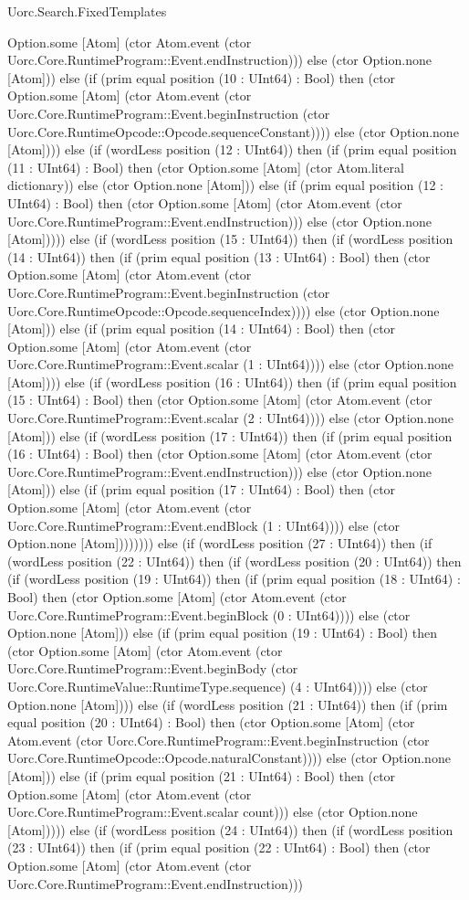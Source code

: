 \begin{lexlean}{Uorc.Search.FixedTemplates}
\begin{semanticmodule}
{Option.some [Atom] (ctor Atom.event (ctor Uorc.Core.RuntimeProgram::Event.endInstruction))) else (ctor Option.none [Atom])) else (if (prim equal position (10 : UInt64) : Bool) then (ctor Option.some [Atom] (ctor Atom.event (ctor Uorc.Core.RuntimeProgram::Event.beginInstruction (ctor Uorc.Core.RuntimeOpcode::Opcode.sequenceConstant)))) else (ctor Option.none [Atom]))) else (if (wordLess position (12 : UInt64)) then (if (prim equal position (11 : UInt64) : Bool) then (ctor Option.some [Atom] (ctor Atom.literal dictionary)) else (ctor Option.none [Atom])) else (if (prim equal position (12 : UInt64) : Bool) then (ctor Option.some [Atom] (ctor Atom.event (ctor Uorc.Core.RuntimeProgram::Event.endInstruction))) else (ctor Option.none [Atom])))) else (if (wordLess position (15 : UInt64)) then (if (wordLess position (14 : UInt64)) then (if (prim equal position (13 : UInt64) : Bool) then (ctor Option.some [Atom] (ctor Atom.event (ctor Uorc.Core.RuntimeProgram::Event.beginInstruction (ctor Uorc.Core.RuntimeOpcode::Opcode.sequenceIndex)))) else (ctor Option.none [Atom])) else (if (prim equal position (14 : UInt64) : Bool) then (ctor Option.some [Atom] (ctor Atom.event (ctor Uorc.Core.RuntimeProgram::Event.scalar (1 : UInt64)))) else (ctor Option.none [Atom]))) else (if (wordLess position (16 : UInt64)) then (if (prim equal position (15 : UInt64) : Bool) then (ctor Option.some [Atom] (ctor Atom.event (ctor Uorc.Core.RuntimeProgram::Event.scalar (2 : UInt64)))) else (ctor Option.none [Atom])) else (if (wordLess position (17 : UInt64)) then (if (prim equal position (16 : UInt64) : Bool) then (ctor Option.some [Atom] (ctor Atom.event (ctor Uorc.Core.RuntimeProgram::Event.endInstruction))) else (ctor Option.none [Atom])) else (if (prim equal position (17 : UInt64) : Bool) then (ctor Option.some [Atom] (ctor Atom.event (ctor Uorc.Core.RuntimeProgram::Event.endBlock (1 : UInt64)))) else (ctor Option.none [Atom]))))))) else (if (wordLess position (27 : UInt64)) then (if (wordLess position (22 : UInt64)) then (if (wordLess position (20 : UInt64)) then (if (wordLess position (19 : UInt64)) then (if (prim equal position (18 : UInt64) : Bool) then (ctor Option.some [Atom] (ctor Atom.event (ctor Uorc.Core.RuntimeProgram::Event.beginBlock (0 : UInt64)))) else (ctor Option.none [Atom])) else (if (prim equal position (19 : UInt64) : Bool) then (ctor Option.some [Atom] (ctor Atom.event (ctor Uorc.Core.RuntimeProgram::Event.beginBody (ctor Uorc.Core.RuntimeValue::RuntimeType.sequence) (4 : UInt64)))) else (ctor Option.none [Atom]))) else (if (wordLess position (21 : UInt64)) then (if (prim equal position (20 : UInt64) : Bool) then (ctor Option.some [Atom] (ctor Atom.event (ctor Uorc.Core.RuntimeProgram::Event.beginInstruction (ctor Uorc.Core.RuntimeOpcode::Opcode.naturalConstant)))) else (ctor Option.none [Atom])) else (if (prim equal position (21 : UInt64) : Bool) then (ctor Option.some [Atom] (ctor Atom.event (ctor Uorc.Core.RuntimeProgram::Event.scalar count))) else (ctor Option.none [Atom])))) else (if (wordLess position (24 : UInt64)) then (if (wordLess position (23 : UInt64)) then (if (prim equal position (22 : UInt64) : Bool) then (ctor Option.some [Atom] (ctor Atom.event (ctor Uorc.Core.RuntimeProgram::Event.endInstruction))) }
\end{semanticmodule}
\end{lexlean}
